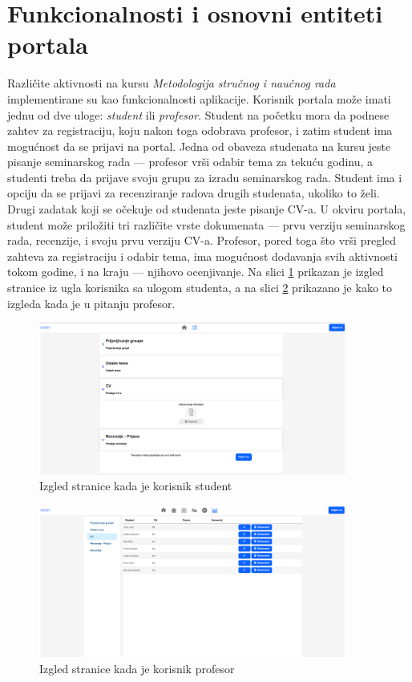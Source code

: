 \documentclass[12pt,oneside]{memoir}
\begin{document}
\section{Funkcionalnosti i osnovni entiteti portala}
\label{sec:entiteti}
\par Različite aktivnosti na kursu \emph{Metodologija stručnog i naučnog rada} implementirane su kao funkcionalnosti aplikacije. Korisnik portala može imati jednu od dve uloge: \emph{student} ili \emph{profesor}. Student na početku mora da podnese zahtev za registraciju, koju nakon toga odobrava profesor, i zatim student ima mogućnost da se prijavi na portal. Jedna od obaveza studenata na kursu jeste pisanje seminarskog rada --- profesor vrši odabir tema za tekuću godinu, a studenti treba da prijave svoju grupu za izradu seminarskog rada. Student ima i opciju da se prijavi za recenziranje radova drugih studenata, ukoliko to želi. Drugi zadatak koji se očekuje od studenata jeste pisanje CV-a. U okviru portala, student može priložiti tri različite vrste dokumenata --- prvu verziju seminarskog rada, recenzije, i svoju prvu verziju CV-a. Profesor, pored toga što vrši pregled zahteva za registraciju i odabir tema, ima mogućnost dodavanja svih aktivnosti tokom godine, i na kraju --- njihovo ocenjivanje. Na slici \ref{fig:studentpage} prikazan je izgled stranice iz ugla korisnika sa ulogom studenta, a na slici \ref{fig:profpage} prikazano je kako to izgleda kada je u pitanju profesor. 

\begin{figure}[!ht]
  \centering
  \label{fig:studentpage}
  \includegraphics[width=0.9\textwidth]{student-page.png}
  \caption{Izgled stranice kada je korisnik student \cite{rad}}
\end{figure}

\begin{figure}[!ht]
  \centering
  \label{fig:profpage}
  \includegraphics[width=0.9\textwidth]{professor-page.png}
  \caption{Izgled stranice kada je korisnik profesor \cite{rad}}
\end{figure}
\end{document}
